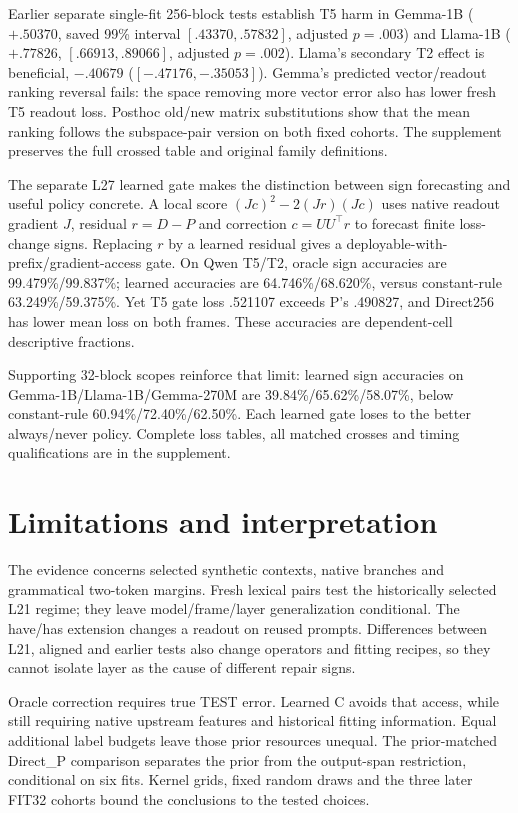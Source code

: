 \documentclass[11pt]{article}
\begin{document}
Earlier separate single-fit 256-block tests establish T5 harm in Gemma-1B ($+.50370$, saved 99\% interval $[.43370,.57832]$, adjusted $p=.003$) and Llama-1B ($+.77826$, $[.66913,.89066]$, adjusted $p=.002$). Llama's secondary T2 effect is beneficial, $-.40679$ ($[-.47176,-.35053]$). Gemma's predicted vector/readout ranking reversal fails: the space removing more vector error also has lower fresh T5 readout loss. Posthoc old/new matrix substitutions show that the mean ranking follows the subspace-pair version on both fixed cohorts. The supplement preserves the full crossed table and original family definitions.

The separate L27 learned gate makes the distinction between sign forecasting and useful policy concrete. A local score $(Jc)^2-2(Jr)(Jc)$ uses native readout gradient $J$, residual $r=D-P$ and correction $c=UU^\top r$ to forecast finite loss-change signs. Replacing $r$ by a learned residual gives a deployable-with-prefix/gradient-access gate. On Qwen T5/T2, oracle sign accuracies are 99.479\%/99.837\%; learned accuracies are 64.746\%/68.620\%, versus constant-rule 63.249\%/59.375\%. Yet T5 gate loss .521107 exceeds P's .490827, and Direct256 has lower mean loss on both frames. These accuracies are dependent-cell descriptive fractions.

Supporting 32-block scopes reinforce that limit: learned sign accuracies on Gemma-1B/Llama-1B/Gemma-270M are 39.84\%/65.62\%/58.07\%, below constant-rule 60.94\%/72.40\%/62.50\%. Each learned gate loses to the better always/never policy. Complete loss tables, all matched crosses and timing qualifications are in the supplement.

\section{Limitations and interpretation}
The evidence concerns selected synthetic contexts, native branches and grammatical two-token margins. Fresh lexical pairs test the historically selected L21 regime; they leave model/frame/layer generalization conditional. The have/has extension changes a readout on reused prompts. Differences between L21, aligned and earlier tests also change operators and fitting recipes, so they cannot isolate layer as the cause of different repair signs.

Oracle correction requires true TEST error. Learned C avoids that access, while still requiring native upstream features and historical fitting information. Equal additional label budgets leave those prior resources unequal. The prior-matched Direct\_P comparison separates the prior from the output-span restriction, conditional on six fits. Kernel grids, fixed random draws and the three later FIT32 cohorts bound the conclusions to the tested choices.
\end{document}
